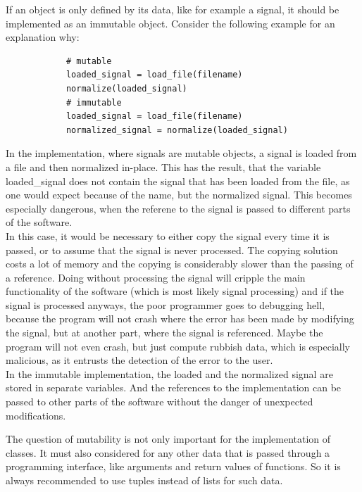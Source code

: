 		If an object is only defined by its data, like for example a signal, it should be implemented as an immutable object.
		Consider the following example for an explanation why:
		\begin{verbatim}
			# mutable
			loaded_signal = load_file(filename)
			normalize(loaded_signal)
			# immutable
			loaded_signal = load_file(filename)
			normalized_signal = normalize(loaded_signal)
		\end{verbatim}
		In the implementation, where signals are mutable objects, a signal is loaded from a file and then normalized in-place.
		This has the result, that the variable {\normalfont \ttfamily loaded\_signal} does not contain the signal that has been loaded from the file, as one would expect because of the name, but the normalized signal.
		This becomes especially dangerous, when the referene to the signal is passed to different parts of the software.\\
		In this case, it would be necessary to either copy the signal every time it is passed, or to assume that the signal is never processed.
		The copying solution costs a lot of memory and the copying is considerably slower than the passing of a reference.
		Doing without processing the signal will cripple the main functionality of the software (which is most likely signal processing) and if the signal is processed anyways, the poor programmer goes to debugging hell, because the program will not crash where the error has been made by modifying the signal, but at another part, where the signal is referenced.
		Maybe the program will not even crash, but just compute rubbish data, which is especially malicious, as it entrusts the detection of the error to the user.\\
		In the immutable implementation, the loaded and the normalized signal are stored in separate variables.
		And the references to the implementation can be passed to other parts of the software without the danger of unexpected modifications.

		The question of mutability is not only important for the implementation of classes.
		It must also considered for any other data that is passed through a programming interface, like arguments and return values of functions.
		So it is always recommended to use tuples instead of lists for such data.


